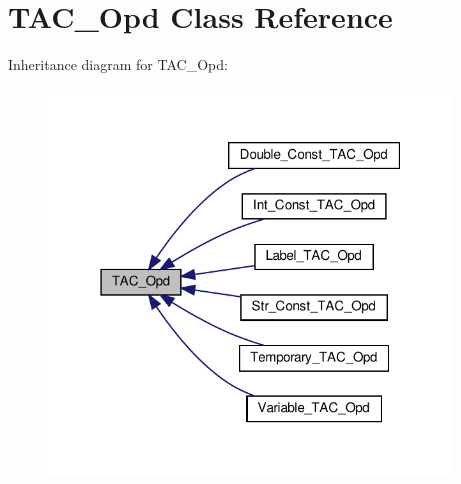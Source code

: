 \hypertarget{classTAC__Opd}{}\section{T\+A\+C\+\_\+\+Opd Class Reference}
\label{classTAC__Opd}


Inheritance diagram for T\+A\+C\+\_\+\+Opd\+:
\nopagebreak
\begin{figure}[H]
\begin{center}
\leavevmode
\includegraphics[width=304pt]{classTAC__Opd__inherit__graph}
\end{center}
\end{figure}
